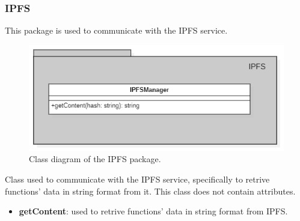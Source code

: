 	\subsubsection{IPFS}
	This package is used to communicate with the IPFS service.
	\begin{figure} [h!]
		\centering
		\includegraphics[width=0.8\linewidth]{diagrammi/etherless-server/IPFS}
		\caption{Class diagram of the IPFS package.}
	\end{figure}
	Class used to communicate with the IPFS service, specifically to retrive functions' data in string format from it.
	This class does not contain attributes.
	\begin{itemize}
		\item \textbf{getContent}: used to retrive functions' data in string format from IPFS.
	\end{itemize}
